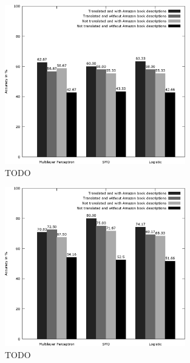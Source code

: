 \begin{figure}
	\label{fig:product_translate_amazon_with_none}
	\begin{center}
		\includegraphics[width=0.7\textwidth]{figures/product_translate_amazon_with_none.eps}
	\end{center}
	\caption{TODO}
\end{figure}

\begin{figure}
	\label{fig:product_translate_amazon_without_none}
	\begin{center}
		\includegraphics[width=0.7\textwidth]{figures/product_translate_amazon_without_none.eps}
	\end{center}
	\caption{TODO}
\end{figure}


